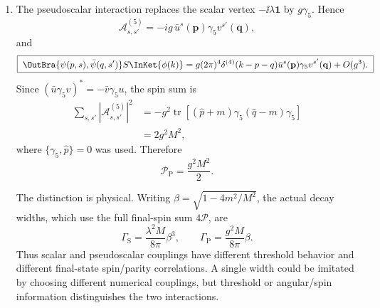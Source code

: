 \begin{enumerate}
\begin{enumerate}
\begin{enumerate}
\[ \qquad p\cdot q=m^2-\frac{M^2}{2}.
\]
Consequently
\[
 \sum_{s,s'}|\mathcal A_{s,s'}|^2
 =2\lambda^2(M^2-4m^2),
 \qquad
 \boxed{\mathcal P_{\mathrm S}
 =\frac{\lambda^2}{2}(M^2-4m^2).}
\]
The expression is nonnegative precisely when the decay is kinematically
allowed, \(M\geq2m\).
\end{enumerate}
\item
The pseudoscalar interaction replaces the scalar vertex
\(-\ii\lambda\mathbf1\) by \(g\gamma_5\).  Hence
\[
 \boxed{\mathcal A^{(5)}_{s,s'}
 =-ig\,\bar u^s(\mathbf p)\gamma_5v^{s'}(\mathbf q),}
\]
and
\[
 \boxed{\;
 \OutBra{\psi(p,s),\bar\psi(q,s')}S\InKet{\phi(k)}
 =g(2\pi)^4\delta^{(4)}(k-p-q)
 \bar u^s(\mathbf p)\gamma_5v^{s'}(\mathbf q)+O(g^3).\;}
\]
Since
\((\bar u\gamma_5v)^*=-\bar v\gamma_5u\), the spin sum is
\[
 \begin{aligned}
 \sum_{s,s'}|\mathcal A^{(5)}_{s,s'}|^2
 &=-g^2\operatorname{tr}\left[
 (\widehat p+m)\gamma_5(\widehat q-m)\gamma_5\right]\\
 &=2g^2M^2,
 \end{aligned}
\]
where \(\{\gamma_5,\widehat p\}=0\) was used.  Therefore
\[
 \boxed{\mathcal P_{\mathrm P}=\frac{g^2M^2}{2}.}
\]

The distinction is physical.  Writing
\(\beta=\sqrt{1-4m^2/M^2}\), the actual decay widths, which use the full
final-spin sum \(4\mathcal P\), are
\[
 \Gamma_{\mathrm S}=\frac{\lambda^2M}{8\pi}\beta^3,\qquad
 \Gamma_{\mathrm P}=\frac{g^2M}{8\pi}\beta.
\]
Thus scalar and pseudoscalar couplings have different threshold behavior
and different final-state spin/parity correlations.  A single width could
be imitated by choosing different numerical couplings, but threshold or
angular/spin information distinguishes the two interactions.
\end{enumerate}


\end{enumerate}
